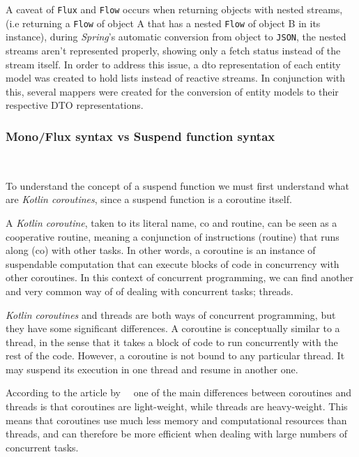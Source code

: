 A caveat of \lstinline{Flux} and \lstinline{Flow} occurs when returning objects with nested streams, (i.e returning a \lstinline{Flow} of object A that has a nested \lstinline{Flow} of object B in its instance), during \textit{Spring}'s automatic conversion from object to \lstinline{JSON}, the nested streams aren't represented properly, showing only a fetch status instead of the stream itself. In order to address this issue, a \acrfull{dto} representation of each entity model was created to hold lists instead of reactive streams. In conjunction with this, several mappers were created for the conversion of entity models to their respective DTO representations.


\subsubsection{Mono/Flux syntax vs Suspend function syntax}~\label{subsubsec:kotlin-coroutines}

To understand the concept of a suspend function we must first understand what are \textit{Kotlin coroutines}, since a suspend function is a coroutine itself.

A \textit{Kotlin coroutine}, taken to its literal name, co and routine, can be seen as a cooperative routine, meaning a conjunction of instructions (routine) that runs along (co) with other tasks. In other words, a coroutine is an instance of suspendable computation that can execute blocks of code in concurrency with other coroutines.
In this context of concurrent programming, we can find another and very common way of of dealing with concurrent tasks; threads. 

\textit{Kotlin coroutines} and threads are both ways of concurrent programming, but they have some significant differences.
A coroutine is conceptually similar to a thread, in the sense that it takes a block of code to run concurrently with the rest of the code. However, a coroutine is not bound to any particular thread. It may suspend its execution in one thread and resume in another one.~\cite{kotlin-coroutines-your-first}

According to the article by~~\cite{kotlin-lightweight} one of the main differences between coroutines and threads is that coroutines are light-weight, while threads are heavy-weight. This means that coroutines use much less memory and computational resources than threads, and can therefore be more efficient when dealing with large numbers of concurrent tasks.

